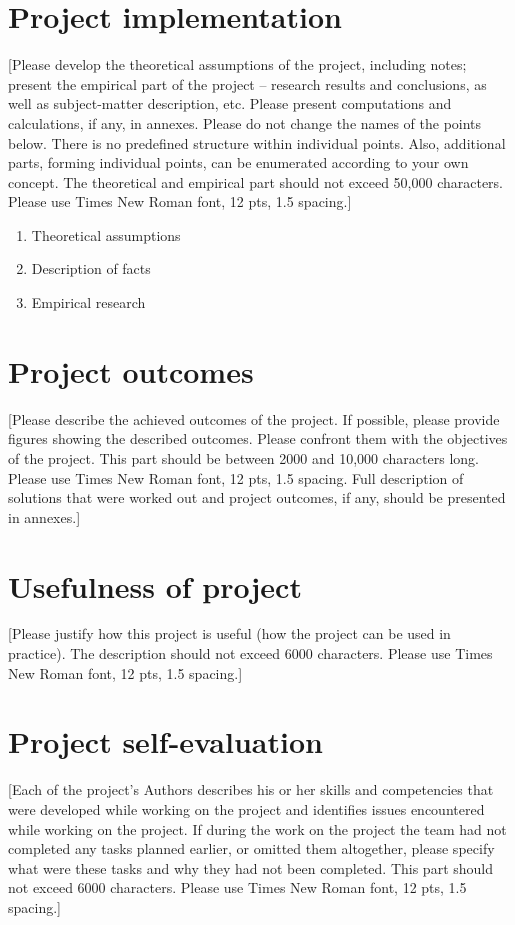 \section{Project implementation}\label{sec:project-implementation}
[Please develop the theoretical assumptions of the project, including notes; present the empirical part of the project – research results and conclusions, as well as subject-matter description, etc.
Please present computations and calculations, if any, in annexes.
Please do not change the names of the points below.
There is no predefined structure within individual points.
Also, additional parts, forming individual points, can be enumerated according to your own concept.
The theoretical and empirical part should not exceed 50,000 characters.
Please use Times New Roman font, 12 pts, 1.5 spacing.] \\

\begin{enumerate}
    \item Theoretical assumptions
    \item Description of facts
    \item Empirical research
\end{enumerate}

\section{Project outcomes}\label{sec:project-outcomes}
[Please describe the achieved outcomes of the project.
If possible, please provide figures showing the described outcomes.
Please confront them with the objectives of the project.
This part should be between 2000 and 10,000 characters long.
Please use Times New Roman font, 12 pts, 1.5 spacing.
Full description of solutions that were worked out and project outcomes, if any, should be presented in annexes.]

\section{Usefulness of project}\label{sec:usefulness-of-project}
[Please justify how this project is useful (how the project can be used in practice). 
The description should not exceed 6000 characters. 
Please use Times New Roman font, 12 pts, 1.5 spacing.]

\section{Project self-evaluation}\label{sec:project-self-evaluation}
[Each of the project’s Authors describes his or her skills and competencies that were developed while working on the project and identifies issues encountered while working on the project. 
If during the work on the project the team had not completed any tasks planned earlier, or omitted them altogether, please specify what were these tasks and why they had not been completed. 
This part should not exceed 6000 characters. 
Please use Times New Roman font, 12 pts, 1.5 spacing.]

